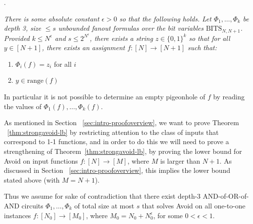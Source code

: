 \documentclass[11pt]{article}
\newtheorem{theorem}{Theorem}
\newcommand{\B}{\{0,1\}}
\begin{document}
\medskip

. {\it There is some absolute constant $\epsilon> 0$ so that the following holds. Let $\Phi_1,\ldots,\Phi_k$ be depth 3, size $\leq s$ unbounded fanout formulas over the bit variables $\mathrm{BITS}_{N,N+1}$. Provided $k \leq N^{\epsilon}$ and $s \leq 2^{N^{\epsilon}}$, there exists a string $z \in \B^k$ so that for all $y \in [N+1]$, there exists an assignment $f: [N] \rightarrow [N+1]$ such that:
\begin{enumerate}
    \item $\Phi_i(f) = z_i$ for all $i$
    \item $y \in \mathrm{range}(f)$
\end{enumerate}
In particular it is not possible to determine an empty pigeonhole of $f$ by reading the values of $\Phi_1(f),\ldots,\Phi_k(f)$.}

\medskip

As mentioned in Section ~\ref{sec:intro-proofoverview}, we want to prove Theorem ~\ref{thm:strongavoid-lb} by restricting attention to the class of inputs that correspond to 1-1 functions, and in order to do this we will need to prove a strengthening of 
Theorem~\ref{thm:strongavoid-lb}, by proving the lower bound for Avoid on input functions $f: [N] \rightarrow [M]$, where $M$ is larger than $N+1$. 
As discussed in Section ~\ref{sec:intro-proofoverview}, this implies the lower bound stated above (with $M=N+1$).
 
Thus we assume for sake of contradiction that there exist depth-3 AND-of-OR-of-AND circuits $\Phi_1, \ldots,\Phi_k$ of total size at most $s$ that solves Avoid on all one-to-one instances $f: [N_0] \rightarrow [M_0]$, where $M_0 = N_0 + N_0^{\epsilon}$, for some $0<\epsilon<1$.
\end{document}
